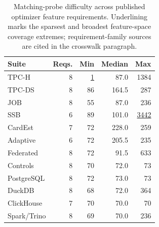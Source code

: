 \begin{table}[t]
\centering
\caption{Matching-probe difficulty across published optimizer feature requirements. Underlining marks the sparsest and broadest feature-space coverage extremes; requirement-family sources are cited in the crosswalk paragraph.}
\label{tab:motif-difficulty}
\footnotesize
\begin{tabular}{lrrrr}
\toprule
Suite & Reqs. & Min & Median & Max  \\
\midrule
TPC-H & 8 & \underline{1} & 87.0 & 1384  \\
TPC-DS & 8 & 86 & 164.5 & 287  \\
JOB & 8 & 55 & 87.0 & 236  \\
SSB & 6 & 89 & 101.0 & \underline{3442}  \\
CardEst & 7 & 72 & 228.0 & 259  \\
Adaptive & 6 & 72 & 205.5 & 235  \\
Federated & 8 & 72 & 91.5 & 633  \\
Controls & 8 & 70 & 72.0 & 73  \\
PostgreSQL & 8 & 72 & 73.0 & 73  \\
DuckDB & 8 & 68 & 72.0 & 364  \\
ClickHouse & 7 & 70 & 70.0 & 70  \\
Spark/Trino & 8 & 69 & 70.0 & 236  \\
\bottomrule
\end{tabular}
\end{table}
